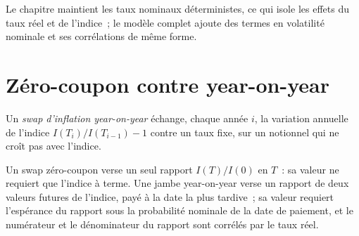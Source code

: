 Le chapitre maintient les taux nominaux déterministes, ce qui isole les effets du
taux réel et de l'indice~; le modèle complet ajoute des termes en volatilité nominale et
ses corrélations de même forme.

\begin{omfigure}

\label{fig:rc:inflation-derivatives:analogy}
\end{omfigure}

\section{Zéro-coupon contre year-on-year}

\begin{definition}\label{def:rc:inflation-derivatives:yoy}
Un \emph{swap d'inflation year-on-year} échange,
chaque année $i$, la variation annuelle de l'indice $I(T_i)/I(T_{i-1})-1$ contre un taux fixe,
sur un notionnel qui ne croît pas avec l'indice.
\end{definition}

Un swap zéro-coupon verse un seul rapport $I(T)/I(0)$ en $T$~: sa valeur ne requiert que
l'indice à terme. Une jambe year-on-year verse un rapport de deux valeurs futures de l'indice, payé
à la date la plus tardive~; sa valeur requiert l'espérance du rapport sous la probabilité
nominale de la date de paiement, et le numérateur et le dénominateur du rapport sont corrélés
par le taux réel.

